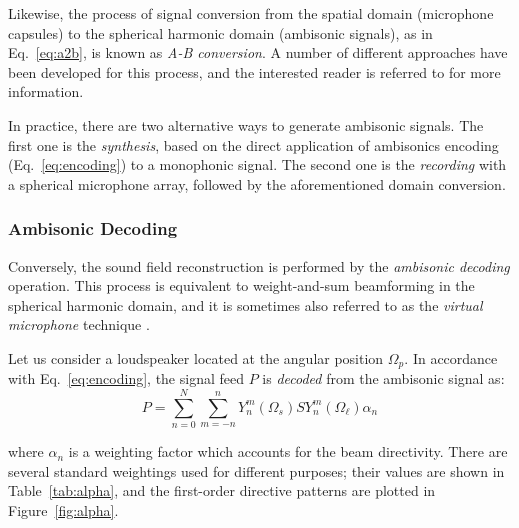 Likewise, the process of signal conversion from the spatial domain (microphone capsules) to the spherical harmonic domain (ambisonic signals), as in Eq.~\ref{eq:a2b}, is known as \textit{A-B conversion}. A number of different approaches have been developed for this process, and the interested reader is referred to \cite{moreau20063d} for more information.

In practice, there are two alternative ways to generate ambisonic signals. The first one is the \textit{synthesis}, based on the direct application of ambisonics encoding (Eq.~\ref{eq:encoding}) to a monophonic signal. The second one is the \textit{recording} with a spherical microphone array, followed by the aforementioned domain conversion. \\


\subsubsection{Ambisonic Decoding}
Conversely, the sound field reconstruction is performed by the \textit{ambisonic decoding} operation. This process is equivalent to weight-and-sum beamforming in the spherical harmonic domain, and it is sometimes also referred to as the \textit{virtual microphone} technique \cite{zotter2019ambisonics}.

Let us consider a loudspeaker located at the angular position $\Omega_p$. In accordance with Eq.~\ref{eq:encoding}, the signal feed $P$ is \textit{decoded} from the ambisonic signal as:
\begin{equation}
	P = \sum_{n=0}^{N} \sum_{m=-n}^{n} Y_n^m(\Omega_s) S Y_n^m(\Omega_\ell)  \alpha_n 
	\label{eq:decoding}
\end{equation}

where $\alpha_n$ is a weighting factor which accounts for the beam directivity.
There are several standard weightings used for different purposes; their values are shown in Table~\ref{tab:alpha}, and the first-order directive patterns are plotted in Figure~\ref{fig:alpha}.

